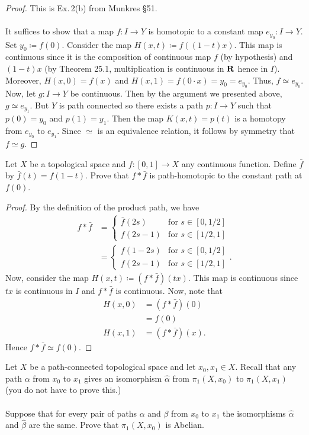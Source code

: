 \begin{proof}
This is Ex.\,2(b) from Munkres \S51.
\\\\
It suffices to show that a map $f\colon I\to Y$ is homotopic to a constant
map $e_{y_0}\colon I\to Y$. Set $y_0\coloneqq f(0)$. Consider the map
$H(x,t)\coloneqq f((1-t)x)$. This map is continuous since it is the
composition of continuous map $f$ (by hypothesis) and $(1-t)x$ (by Theorem
25.1, multiplication is continuous in $\mathbf{R}$ hence in $I$). Moreover,
$H(x,0)=f(x)$ and $H(x,1)=f(0\cdot x)=y_0=e_{y_0}$. Thus, $f\simeq
e_{y_0}$. Now, let $g\colon I\to Y$ be continuous. Then by the argument we
presented above, $g\simeq e_{y_1}$. But $Y$ is path connected so there
exists a path $p\colon I\to Y$ such that $p(0)=y_0$ and $p(1)=y_1$. Then
the map $K(x,t)=p(t)$ is a homotopy from $e_{y_0}$ to $e_{y_1}$. Since
$\simeq$ is an equivalence relation, it follows by symmetry that $f\simeq
g$.
\end{proof}
\begin{problem}
Let $X$ be a topological space and $f\colon[0,1]\to X$ any
continuous function. Define $\bar f$ by $\bar f(t)=f(1-t)$. Prove
that $f*\bar f$ is path-homotopic to the constant path at $f(0)$.
\end{problem}
\begin{proof}
By the definition of the product path, we have
\begin{align*}
f*\bar f&=
\begin{cases}
\bar f(2s)&\text{for $s\in [0,1/2]$}\\
f(2s-1)&\text{for $s\in[1/2,1]$}
\end{cases}\\
&=
\begin{cases}
f(1-2s)&\text{for $s\in [0,1/2]$}\\
f(2s-1)&\text{for $s\in[1/2,1]$}
\end{cases}.
\end{align*}
Now, consider the map $H(x,t)\coloneqq(f*\bar f)(tx)$. This map is
continuous since $tx$ is continuous in $I$ and $f*\bar f$ is
continuous. Now, note that
\begin{align*}
H(x,0)&=(f*\bar f)(0)\\
      &=f(0)\\
H(x,1)&=(f*\bar f)(x).
\end{align*}
Hence $f*\bar f\simeq f(0)$.
\end{proof}
\begin{problem}
Let $X$ be a path-connected topological space and let $x_0,x_1\in
X$. Recall that any path $\alpha$ from $x_0$ to $x_1$  gives an
isomorphism $\hat\alpha$ from $\pi_1(X,x_0)$ to $\pi_1(X,x_1)$
(you do not have to prove this.)
\\\\
Suppose that for every pair of paths $\alpha$ and $\beta$ from
$x_0$ to $x_1$ the isomorphisms $\hat\alpha$ and $\hat\beta$  are
the same. Prove that $\pi_1(X,x_0)$ is Abelian.
\end{problem}
